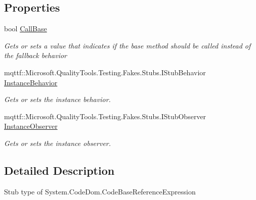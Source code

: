 \subsection*{Properties}
\begin{DoxyCompactItemize}
\item 
bool \hyperlink{class_system_1_1_code_dom_1_1_fakes_1_1_stub_code_base_reference_expression_acf0be4b700fd5fb774f2e853552c4002}{Call\-Base}
\begin{DoxyCompactList}\small\item\em Gets or sets a value that indicates if the base method should be called instead of the fallback behavior\end{DoxyCompactList}\item 
mqttf\-::\-Microsoft.\-Quality\-Tools.\-Testing.\-Fakes.\-Stubs.\-I\-Stub\-Behavior \hyperlink{class_system_1_1_code_dom_1_1_fakes_1_1_stub_code_base_reference_expression_aff0df559de52ec45d73c871dfd533f70}{Instance\-Behavior}
\begin{DoxyCompactList}\small\item\em Gets or sets the instance behavior.\end{DoxyCompactList}\item 
mqttf\-::\-Microsoft.\-Quality\-Tools.\-Testing.\-Fakes.\-Stubs.\-I\-Stub\-Observer \hyperlink{class_system_1_1_code_dom_1_1_fakes_1_1_stub_code_base_reference_expression_a7b598feedf3abeda00bffbc8754efece}{Instance\-Observer}
\begin{DoxyCompactList}\small\item\em Gets or sets the instance observer.\end{DoxyCompactList}\end{DoxyCompactItemize}


\subsection{Detailed Description}
Stub type of System.\-Code\-Dom.\-Code\-Base\-Reference\-Expression



